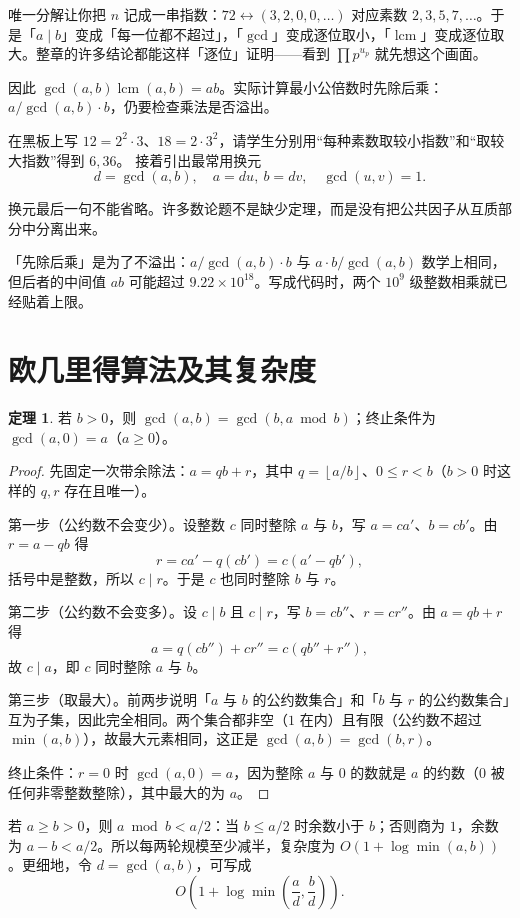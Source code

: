 \documentclass[UTF8,a4paper,11pt,oneside,openany,fontset=fandol]{ctexbook}
\theoremstyle{definition}
\newtheorem{theorem}[definition]{定理}
\newcommand{\lcm}{\operatorname{lcm}}
\newcommand{\floor}[1]{\left\lfloor #1\right\rfloor}
\begin{document}
\begin{tip}
唯一分解让你把 $n$ 记成一串指数：$72\leftrightarrow(3,2,0,0,\ldots)$ 对应素数 $2,3,5,7,\ldots$。于是「$a\mid b$」变成「每一位都不超过」，「$\gcd$」变成逐位取小，「$\lcm$」变成逐位取大。整章的许多结论都能这样「逐位」证明——看到 $\prod p^{u_p}$ 就先想这个画面。
\end{tip}

因此 $\gcd(a,b)\lcm(a,b)=ab$。实际计算最小公倍数时先除后乘：$a/\gcd(a,b)\cdot b$，仍要检查乘法是否溢出。


\begin{teach}
在黑板上写 $12=2^2\cdot3$、$18=2\cdot3^2$，请学生分别用“每种素数取较小指数”和“取较大指数”得到 $6,36$。
接着引出最常用换元
\[
 d=\gcd(a,b),\quad a=du,\ b=dv,\quad\gcd(u,v)=1.
\]


换元最后一句不能省略。许多数论题不是缺少定理，而是没有把公共因子从互质部分中分离出来。
\end{teach}

\begin{tip}
「先除后乘」是为了不溢出：$a/\gcd(a,b)\cdot b$ 与 $a\cdot b/\gcd(a,b)$ 数学上相同，但后者的中间值 $ab$ 可能超过 $9.22\times10^{18}$。写成代码时，两个 $10^9$ 级整数相乘就已经贴着上限。
\end{tip}



\section{欧几里得算法及其复杂度}
\begin{theorem}
若 $b>0$，则 $\gcd(a,b)=\gcd(b,a\bmod b)$；终止条件为 $\gcd(a,0)=a$（$a\ge0$）。
\end{theorem}
\begin{proof}
先固定一次带余除法：$a=qb+r$，其中 $q=\floor{a/b}$、$0\le r<b$（$b>0$ 时这样的 $q,r$ 存在且唯一）。

第一步（公约数不会变少）。设整数 $c$ 同时整除 $a$ 与 $b$，写 $a=ca'$、$b=cb'$。由 $r=a-qb$ 得
\[
 r=ca'-q(cb')=c(a'-qb'),
\]
括号中是整数，所以 $c\mid r$。于是 $c$ 也同时整除 $b$ 与 $r$。

第二步（公约数不会变多）。设 $c\mid b$ 且 $c\mid r$，写 $b=cb''$、$r=cr''$。由 $a=qb+r$ 得
\[
 a=q(cb'')+cr''=c(qb''+r''),
\]
故 $c\mid a$，即 $c$ 同时整除 $a$ 与 $b$。

第三步（取最大）。前两步说明「$a$ 与 $b$ 的公约数集合」和「$b$ 与 $r$ 的公约数集合」互为子集，因此完全相同。两个集合都非空（$1$ 在内）且有限（公约数不超过 $\min(a,b)$），故最大元素相同，这正是 $\gcd(a,b)=\gcd(b,r)$。

终止条件：$r=0$ 时 $\gcd(a,0)=a$，因为整除 $a$ 与 $0$ 的数就是 $a$ 的约数（$0$ 被任何非零整数整除），其中最大的为 $a$。
\end{proof}
若 $a\ge b>0$，则 $a\bmod b<a/2$：当 $b\le a/2$ 时余数小于 $b$；否则商为 $1$，余数为 $a-b<a/2$。所以每两轮规模至少减半，复杂度为 $O(1+\log\min(a,b))$。更细地，令 $d=\gcd(a,b)$，可写成
\[
 O\!\left(1+\log\min\left(\frac ad,\frac bd\right)\right).
\]
\end{document}
